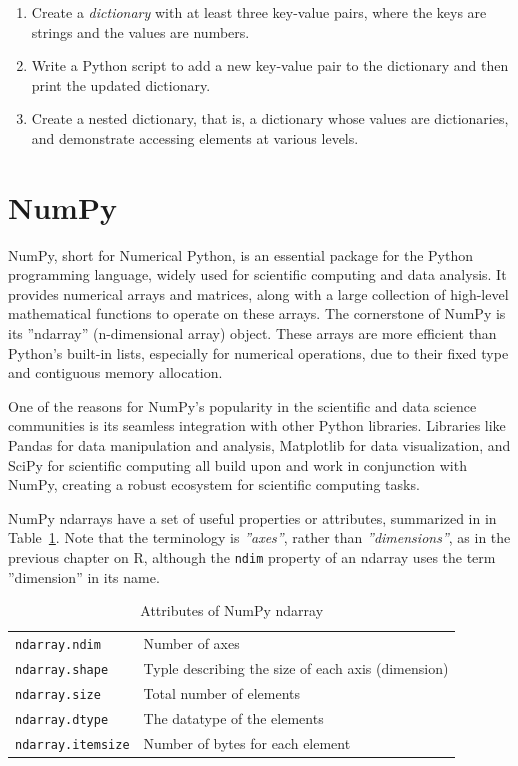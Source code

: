 \begin{exerciseboxcomputer}
\begin{enumerate}
    \item Create a \emph{dictionary} with at least three key-value pairs, where the keys are strings and the values are numbers.
    \item Write a Python script to add a new key-value pair to the dictionary and then print the updated dictionary.
    \item Create a nested dictionary, that is, a dictionary whose values are dictionaries, and demonstrate accessing elements at various levels.
\end{enumerate}
\end{exerciseboxcomputer}

\section{NumPy}

NumPy, short for Numerical Python, is an essential package for the Python programming language, widely used for scientific computing and data analysis. It provides numerical arrays and matrices, along with a large collection of high-level mathematical functions to operate on these arrays. The cornerstone of NumPy is its ''ndarray'' (n-dimensional array) object. These arrays are more efficient than Python's built-in lists, especially for numerical operations, due to their fixed type and contiguous memory allocation.

One of the reasons for NumPy's popularity in the scientific and data science communities is its seamless integration with other Python libraries. Libraries like Pandas for data manipulation and analysis, Matplotlib for data visualization, and SciPy for scientific computing all build upon and work in conjunction with NumPy, creating a robust ecosystem for scientific computing tasks.

NumPy ndarrays have a set of useful properties or attributes, summarized in in Table~\ref{tab:numpydatatypes}. Note that the terminology is \emph{''axes''}, rather than \emph{''dimensions''}, as in the previous chapter on R, although the \texttt{ndim} property of an ndarray uses the term ''dimension'' in its name.

\begin{table}
\centering
\renewcommand{\arraystretch}{1.25}
\begin{tabularx}{\linewidth}{l|X} \hline
\texttt{ndarray.ndim} & Number of axes \\
\texttt{ndarray.shape} & Typle describing the size of each axis (dimension)\index{Shape (of array)} \\
\texttt{ndarray.size} & Total number of elements \\
\texttt{ndarray.dtype} & The datatype of the elements \\
\texttt{ndarray.itemsize} & Number of bytes for each element \\ \hline
\end{tabularx}
\caption{Attributes of NumPy ndarray}
\label{tab:numpydatatypes}
\end{table}

